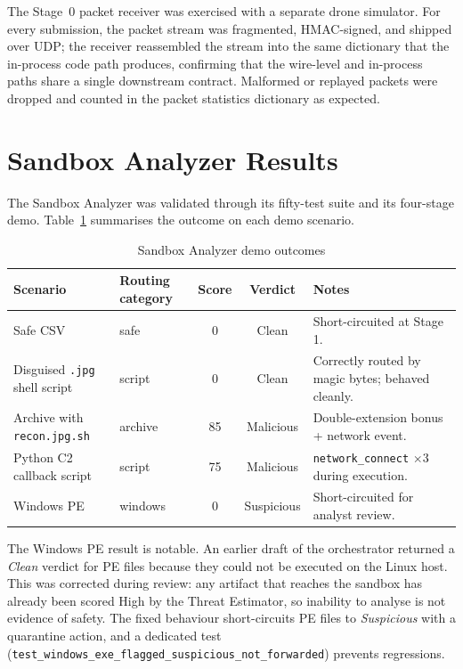 \documentclass[12pt, a4paper]{report}
\begin{document}
The Stage~0 packet receiver was exercised with a separate drone
simulator. For every submission, the packet stream was fragmented,
HMAC-signed, and shipped over UDP; the receiver reassembled the
stream into the same dictionary that the in-process code path
produces, confirming that the wire-level and in-process paths share a
single downstream contract. Malformed or replayed packets were
dropped and counted in the packet statistics dictionary as expected.

\section{Sandbox Analyzer Results}

The Sandbox Analyzer was validated through its fifty-test suite and
its four-stage demo. Table~\ref{tab:sb_demo} summarises the outcome
on each demo scenario.

\begin{table}[H]
\centering
\caption{Sandbox Analyzer demo outcomes}
\label{tab:sb_demo}
\begin{tabular}{|l|l|c|c|l|}
\hline
\textbf{Scenario} & \textbf{Routing category} & \textbf{Score} & \textbf{Verdict} & \textbf{Notes} \\
\hline
Safe CSV & safe & 0 & Clean & Short-circuited at Stage 1. \\
\hline
Disguised \texttt{.jpg} shell script & script & 0 & Clean & Correctly routed by magic bytes; behaved cleanly. \\
\hline
Archive with \texttt{recon.jpg.sh} & archive & 85 & Malicious & Double-extension bonus + network event. \\
\hline
Python C2 callback script & script & 75 & Malicious & \texttt{network\_connect} $\times 3$ during execution. \\
\hline
Windows PE & windows & 0 & Suspicious & Short-circuited for analyst review. \\
\hline
\end{tabular}
\end{table}

The Windows PE result is notable. An earlier draft of the orchestrator
returned a \emph{Clean} verdict for PE files because they could not be
executed on the Linux host. This was corrected during review: any
artifact that reaches the sandbox has already been scored High by the
Threat Estimator, so inability to analyse is not evidence of safety.
The fixed behaviour short-circuits PE files to \emph{Suspicious} with
a quarantine action, and a dedicated test
(\texttt{test\_windows\_exe\_flagged\_suspicious\_not\_forwarded})
prevents regressions.
\end{document}
